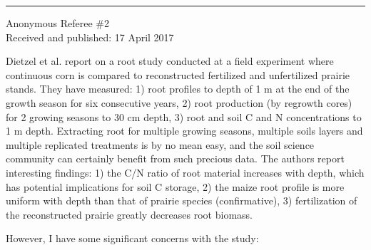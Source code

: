 \documentclass[]{article}
\begin{document}
\begin{center}\rule{0.5\linewidth}{\linethickness}\end{center}

Anonymous Referee \#2\\
Received and published: 17 April 2017

Dietzel et al. report on a root study conducted at a field experiment
where continuous corn is compared to reconstructed fertilized and
unfertilized prairie stands. They have measured: 1) root profiles to
depth of 1 m at the end of the growth season for six consecutive years,
2) root production (by regrowth cores) for 2 growing seasons to 30 cm
depth, 3) root and soil C and N concentrations to 1 m depth. Extracting
root for multiple growing seasons, multiple soils layers and multiple
replicated treatments is by no mean easy, and the soil science community
can certainly benefit from such precious data. The authors report
interesting findings: 1) the C/N ratio of root material increases with
depth, which has potential implications for soil C storage, 2) the maize
root profile is more uniform with depth than that of prairie species
(confirmative), 3) fertilization of the reconstructed prairie greatly
decreases root biomass.

However, I have some significant concerns with the study:
\end{document}
